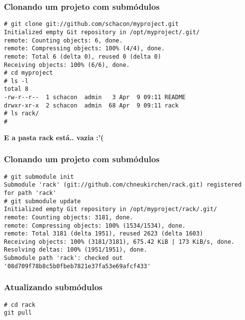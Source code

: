 \begin{frame}[fragile]
\frametitle{Clonando um projeto com submódulos}

\scriptsize
\begin{verbatim}
# git clone git://github.com/schacon/myproject.git
Initialized empty Git repository in /opt/myproject/.git/
remote: Counting objects: 6, done.
remote: Compressing objects: 100% (4/4), done.
remote: Total 6 (delta 0), reused 0 (delta 0)
Receiving objects: 100% (6/6), done.
# cd myproject
# ls -l
total 8
-rw-r--r--  1 schacon  admin   3 Apr  9 09:11 README
drwxr-xr-x  2 schacon  admin  68 Apr  9 09:11 rack
# ls rack/
#
\end{verbatim}
\normalsize

\textbf{E a pasta rack está.. vazia :'(}

\end{frame}
\begin{frame}[fragile]
\frametitle{Clonando um projeto com submódulos}

\scriptsize
\begin{verbatim}
# git submodule init
Submodule 'rack' (git://github.com/chneukirchen/rack.git) registered for path 'rack'
# git submodule update
Initialized empty Git repository in /opt/myproject/rack/.git/
remote: Counting objects: 3181, done.
remote: Compressing objects: 100% (1534/1534), done.
remote: Total 3181 (delta 1951), reused 2623 (delta 1603)
Receiving objects: 100% (3181/3181), 675.42 KiB | 173 KiB/s, done.
Resolving deltas: 100% (1951/1951), done.
Submodule path 'rack': checked out '08d709f78b8c5b0fbeb7821e37fa53e69afcf433'
\end{verbatim}
\normalsize
\end{frame}

\begin{frame}[fragile]
\frametitle{Atualizando submódulos}
\scriptsize
\begin{verbatim}
# cd rack
git pull
\end{verbatim}
\normalsize
\end{frame}
